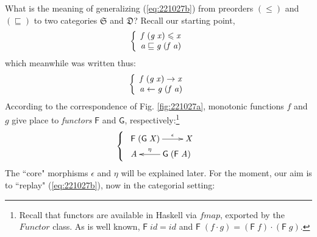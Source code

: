 \documentclass{elsarticle}
\newcommand{\Conid}[1]{\mathit{#1}}
\newcommand{\Varid}[1]{\mathit{#1}}
\renewcommand{\leq}{\leqslant}
\newenvironment{lcbr}{\left\{\begin{array}{l}}{\end{array}\right.}
\def\comp{ \mathbin{\cdot} }
\def\fun#1{\mathsf{#1}}
\def\cat#1{{\mathfrak #1}}
\def\larrow#1#2#3{\xymatrix{ #3 & #1 \ar[l]_-{#2} }}
\def\rarrow#1#2#3{\xymatrix{ #1 \ar[r]^-{#2} & #3 }}
\begin{document}
What is the meaning
of generalizing (\ref{eq:221027b}) from preorders \ensuremath{(\leq )} and \ensuremath{(\sqsubseteq )} to two
categories \ensuremath{\cat{S}} and \ensuremath{\cat{D}}? Recall our starting point,
\begin{eqnarray*}
\ensuremath{\begin{lcbr}\Varid{f}\;(\Varid{g}\;\Varid{x})\leq \Varid{x}\\\Varid{a}\sqsubseteq \Varid{g}\;(\Varid{f}\;\Varid{a})\end{lcbr}}
\end{eqnarray*}
which meanwhile was written thus:
\begin{eqnarray*}
\ensuremath{\begin{lcbr}\Varid{f}\;(\Varid{g}\;\Varid{x})\to \Varid{x}\\\Varid{a}\leftarrow \Varid{g}\;(\Varid{f}\;\Varid{a})\end{lcbr}}
\end{eqnarray*}
According to the correspondence of Fig. \ref{fig:221027a}, monotonic functions \ensuremath{\Varid{f}} and \ensuremath{\Varid{g}} give place to \emph{functors} \ensuremath{\fun F } and \ensuremath{\fun G }, respectively:\footnote{Recall that functors are available in Haskell via
\ensuremath{\Varid{fmap}}, exported by the \ensuremath{\Conid{Functor}} class. As is well known, \ensuremath{\fun F \;{id}\mathrel{=}{id}} and \ensuremath{\fun F \;(\Varid{f} \comp \Varid{g})\mathrel{=}(\fun F \;\Varid{f}) \comp (\fun F \;\Varid{g})}.
}
\begin{eqnarray}
\ensuremath{\begin{lcbr}\rarrow{\fun F \;(\fun G \;\Conid{X})}{\epsilon }{\Conid{X}}\\\larrow{\fun G \;(\fun F \;\Conid{A})}{\eta }{\Conid{A}}\end{lcbr}}
\end{eqnarray}
The ``core" morphisms \ensuremath{\epsilon } and \ensuremath{\eta } will be explained later. For the
moment, our aim is to ``replay" (\ref{eq:221027b}), now in the categorial setting:
\end{document}

